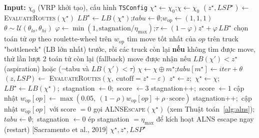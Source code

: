 \documentclass[12pt,a4paper]{article}
\begin{document}
\begin{algorithm}[H]
\caption{Adaptive Tabu Search (Lớp 1 -- routing)}
\begin{algorithmic}[1]
\STATE \textbf{Input:} $\chi_0$ (VRP khởi tạo), cấu hình \texttt{TSConfig}
\STATE $\chi^\star \leftarrow \chi_0$;\quad $\chi \leftarrow \chi_0$
\STATE $(z^\star, LSP^\star) \leftarrow$ \textsc{EvaluateRoutes}$(\chi^\star)$ 
\STATE $LB^\star \leftarrow LB(\chi^\star)$;\quad $tabu \leftarrow \emptyset$;\quad $w_{\text{op}} \leftarrow (1,1,1)$ 
    \STATE $\theta \sim \mathcal{U}(\theta_{lo}, \theta_{hi})$ 
    \STATE $\varphi \leftarrow \min(1, \text{stagnation}/\eta_{\max})$;\quad $\tau \leftarrow (1-\varphi)z^\star + \varphi\, LB^\star$
    \STATE chọn toán tử $op$ theo roulette-wheel trên $w_{\text{op}}$
    \STATE tìm move tốt nhất của $op$ trên truck "bottleneck" (LB lớn nhất) trước, rồi các truck còn lại
    \STATE \textbf{nếu} không tìm được move, thử lần lượt 2 toán tử còn lại (fallback)
    \STATE move được nhận nếu $LB(\chi') < z^\star$ (aspiration) hoặc ($\neg$tabu và $LB(\chi') < \tau$)
        \STATE $\chi \leftarrow \chi \oplus m^\star$;\quad $tabu[m^\star] \leftarrow iter+\theta$
        \STATE $(z, LSP) \leftarrow$ \textsc{EvaluateRoutes}$(\chi,\ \text{cutoff}=z^\star-\varepsilon)$ 
            \STATE $z^\star \leftarrow z$;\ $\chi^\star \leftarrow \chi$;\ $LB^\star \leftarrow LB(\chi^\star)$;\ stagnation $\leftarrow 0$;\ score $\leftarrow 3$
        \ELSE
            \STATE stagnation++;\ score $\leftarrow 1$
        \ENDIF
        \STATE cập nhật $w_{\text{op}}[op] \leftarrow \max(0.05,\ (1-\rho)w_{\text{op}}[op] + \rho\cdot\text{score})$ 
    \ELSE
        \STATE stagnation++;\ cập nhật $w_{\text{op}}[op]$ với score $=0$
    \ENDIF
        \STATE gọi \textsc{ALNSEscape}$(\chi^\star)$ (xem Thuật toán~\ref{alg:alns}); $tabu \leftarrow \emptyset$;\ stagnation $\leftarrow 0$
    \ENDIF
        \STATE ép stagnation $=\eta_{\max}$ để kích hoạt ALNS escape ngay (restart) [Sacramento et al., 2019]
    \ENDIF
\ENDWHILE
\RETURN $\chi^\star, z^\star, LSP^\star$
\end{algorithmic}
\end{algorithm}
\end{document}
